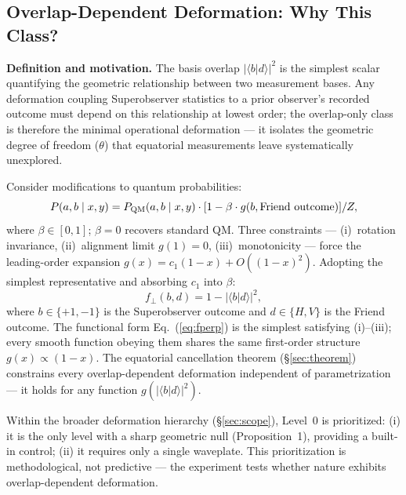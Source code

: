 \documentclass[twocolumn,aps,pra,superscriptaddress,floatfix,10pt]{revtex4-2}
\begin{document}
\subsection{Overlap-Dependent Deformation: Why This Class?}
\label{sec:why_class}

\textbf{Definition and motivation.} The basis overlap $|\langle b|d\rangle|^2$ is the simplest
scalar quantifying the geometric relationship between two measurement bases.
Any deformation coupling Superobserver statistics to a prior observer's recorded
outcome must depend on this relationship at lowest order; the overlap-only
class is therefore the minimal operational deformation --- it isolates the
geometric degree of freedom ($\theta$) that equatorial measurements leave
systematically unexplored.

Consider modifications to quantum probabilities:
\begin{equation}
P(a,b \mid x,y) = P_{\rm QM}(a,b \mid x,y) \cdot [1 - \beta \cdot g(b, \text{Friend outcome})] / Z,
\label{eq:model_class}
\end{equation}
where $\beta \in [0,1]$; $\beta = 0$ recovers standard QM. Three constraints --- (i)~rotation
invariance, (ii)~alignment limit $g(1)=0$, (iii)~monotonicity --- force the
leading-order expansion $g(x) = c_1(1-x) + O((1-x)^2)$. Adopting the simplest
representative and absorbing $c_1$ into $\beta$:
\begin{equation}
f_\perp(b, d) = 1 - |\langle b|d\rangle|^2,
\label{eq:fperp}
\end{equation}
where $b \in \{+1,-1\}$ is the Superobserver outcome and $d \in \{H,V\}$ is the Friend
outcome. The functional form Eq.~(\ref{eq:fperp}) is the simplest satisfying (i)--(iii);
every smooth function obeying them shares the same first-order structure
$g(x) \propto (1-x)$. The equatorial cancellation theorem (\S\ref{sec:theorem}) constrains every
overlap-dependent deformation independent of parametrization --- it holds for
any function $g(|\langle b|d\rangle|^2)$.

Within the broader deformation hierarchy (\S\ref{sec:scope}), Level~0 is prioritized:
(i) it is the only level with a sharp geometric null (Proposition~1),
providing a built-in control; (ii) it requires only a single waveplate.
This prioritization is methodological, not predictive --- the experiment
tests whether nature exhibits overlap-dependent deformation.
\end{document}
